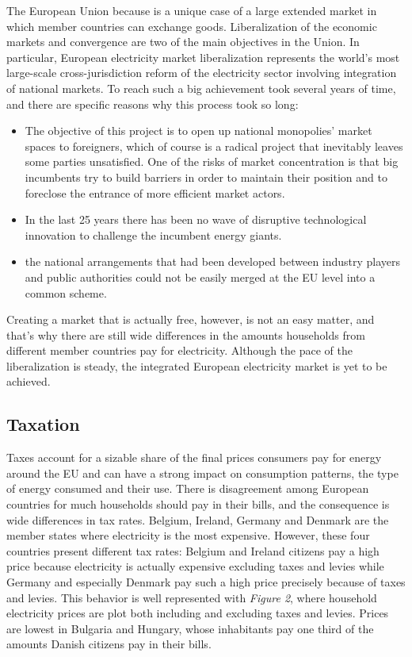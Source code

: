\documentclass{book}
\begin{document}
The European Union because is a unique case of a large extended market in which member countries can exchange goods.  Liberalization of the economic markets and convergence are two of the main objectives in the Union. In particular, European electricity market liberalization represents the world's most large-scale cross-jurisdiction reform of the electricity sector involving integration of national markets. To reach such a big achievement took several years of time, and there are specific reasons why this process took so long:

\begin{itemize}

\item The objective of this project is to open up national monopolies’ market spaces to foreigners, which of course is a radical
project that inevitably leaves some parties unsatisfied.  One of the risks of market concentration is that big incumbents try to build
barriers in order to maintain their position and to foreclose the entrance of more efficient market actors. \cite{ringel2003liberalising}

\item In the last 25 years there has been no wave of disruptive technological innovation to challenge the incumbent energy
giants.

\item the national arrangements that had been developed between industry players and public authorities could not be easily merged at the EU level into a common scheme.
\end{itemize}

Creating a market that is actually free, however, is not an easy matter, and that's why there are still wide differences in the amounts households from different member countries pay for electricity. Although the pace of the liberalization is steady, the integrated European electricity market is yet to be achieved. \\

\subsection*{Taxation}

Taxes account for a sizable share of the final prices consumers pay for energy around the EU and can have a strong impact on consumption patterns, the type of energy consumed and their use. There is disagreement among European countries for much households should pay in their bills, and the consequence is wide differences in tax rates. Belgium, Ireland, Germany and Denmark are the member states where electricity is the most expensive. However, these four countries present different tax rates: Belgium and Ireland citizens pay a high price because electricity is actually expensive excluding taxes and levies while Germany and especially Denmark pay such a high price precisely because of taxes and levies. This behavior is well represented with \textit{Figure 2}, where household electricity prices are plot both including and excluding taxes and levies. Prices are lowest in Bulgaria and Hungary, whose inhabitants pay one third of the amounts Danish citizens pay in their bills. 
\end{document}
